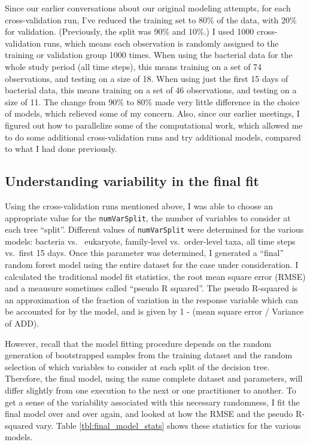 \documentclass{article}
\begin{document}
Since our earlier conversations about our original modeling attempts,
for each cross-validation run, I've reduced the training set to 80\%
of the data, with 20\% for validation.  (Previously, the split was
90\% and 10\%.)  I used 1000 cross-validation runs, which means each
observation is randomly assigned to the training or validation group
1000 times.  When using the bacterial data for the whole study period
(all time steps), this means training on a set of 74 observations, and
testing on a size of 18.  When using just the first 15 days of
bacterial data, this means training on a set of 46 observations, and
testing on a size of 11.  The change from 90\% to 80\% made very
little difference in the choice of models, which relieved some of my
concern.  Also, since our earlier meetings, I figured out how to
parallelize some of the computational work, which allowed me to do
some additional cross-validation runs and try additional models,
compared to what I had done previously.


\subsection{Understanding variability in the final fit}

Using the cross-validation runs mentioned above, I was able to choose
an appropriate value for the \texttt{numVarSplit}, the number of
variables to consider at each tree ``split''.  Different values of
\texttt{numVarSplit} were determined for the various models: bacteria
vs.~ eukaryote, family-level vs.~order-level taxa, all time steps
vs.~first 15 days.  Once this parameter was determined, I generated a
``final'' random forest model using the entire dataset for the case
under consideration.  I calculated the traditional model fit
statistics, the root mean square error (RMSE) and a meausure sometimes
called ``pseudo R squared''.  The pseudo R-squared is an approximation
of the fraction of variation in the response variable which can be
accounted for by the model, and is given by 1 - (mean square error /
Variance of ADD).

However, recall that the model fitting procedure depends on the random
generation of bootstrapped samples from the training dataset and the
random selection of which variables to consider at each split of the
decision tree.  Therefore, the final model, using the same complete
dataset and parameters, will differ slightly from one execution to the
next or one practitioner to another.  To get a sense of the
variability associated with this necessary randomness, I fit the final
model over and over again, and looked at how the RMSE and the pseudo
R-squared vary.  Table \ref{tbl:final_model_stats} shows
these statistics for the various models.
\end{document}
